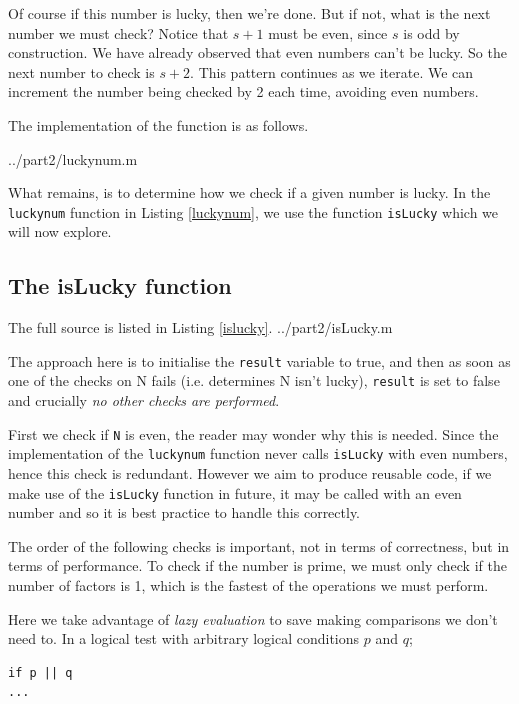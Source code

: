 \documentclass[10pt]{article}
\begin{document}
Of course if this number is lucky, then we're done. But if not, what is the next number we must check? Notice that $s + 1$ must be even, since $s$ is odd by construction. We have already observed that even numbers can't be lucky. So the next number to check is $s+2$. This pattern continues as we iterate. We can increment the number being checked by 2 each time, avoiding even numbers.

The implementation of the function is as follows. 

   {../part2/luckynum.m}

What remains, is to determine how we check if a given number is lucky. In the \texttt{luckynum} function in Listing \ref{luckynum}, we use the function \texttt{isLucky} which we will now explore.

  
\subsection{The isLucky function}

The full source is listed in Listing \ref{islucky}.
   {../part2/isLucky.m}
  
The approach here is to initialise the \texttt{result} variable to true, and then as soon as one of the checks on N fails (i.e. determines N isn't lucky),  \texttt{result} is set to false and crucially \emph{no other checks are performed}. 

First we check if \texttt{N} is even, the reader may wonder why this is needed. Since the implementation of the \texttt{luckynum} function never calls \texttt{isLucky} with even numbers, hence this check is redundant. However we aim to produce reusable code, if we make use of the \texttt{isLucky} function in future, it may be called with an even number and so it is best practice to handle this correctly.

The order of the following checks is important, not in terms of correctness, but in terms of performance.  To check if the number is prime, we must only check if the number of factors is 1, which is the fastest of the operations we must perform.

Here we take advantage of \emph{lazy evaluation} to save making comparisons we don't need to. In a logical test with arbitrary logical conditions $p$ and $q$;

\begin{verbatim}
if p || q
...
\end{verbatim}
\end{document}
